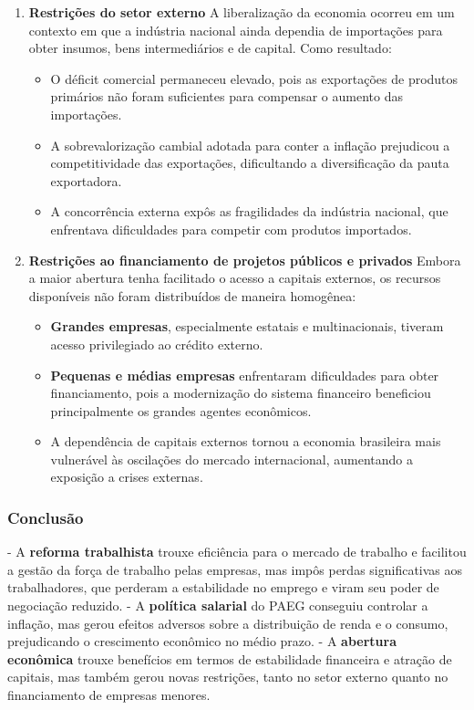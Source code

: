 \documentclass[a4paper,12pt]{article}[abntex2]
\begin{document}
\begin{enumerate}
    \item \textbf{Restrições do setor externo}  
    A liberalização da economia ocorreu em um contexto em que a indústria nacional ainda dependia de importações para obter insumos, bens intermediários e de capital. Como resultado:
    \begin{itemize}
        \item O déficit comercial permaneceu elevado, pois as exportações de produtos primários não foram suficientes para compensar o aumento das importações.
        \item A sobrevalorização cambial adotada para conter a inflação prejudicou a competitividade das exportações, dificultando a diversificação da pauta exportadora.
        \item A concorrência externa expôs as fragilidades da indústria nacional, que enfrentava dificuldades para competir com produtos importados.
    \end{itemize}

    \item \textbf{Restrições ao financiamento de projetos públicos e privados}  
    Embora a maior abertura tenha facilitado o acesso a capitais externos, os recursos disponíveis não foram distribuídos de maneira homogênea:
    \begin{itemize}
        \item \textbf{Grandes empresas}, especialmente estatais e multinacionais, tiveram acesso privilegiado ao crédito externo.
        \item \textbf{Pequenas e médias empresas} enfrentaram dificuldades para obter financiamento, pois a modernização do sistema financeiro beneficiou principalmente os grandes agentes econômicos.
        \item A dependência de capitais externos tornou a economia brasileira mais vulnerável às oscilações do mercado internacional, aumentando a exposição a crises externas.
    \end{itemize}
\end{enumerate}

\subsubsection{Conclusão}
- A \textbf{reforma trabalhista} trouxe eficiência para o mercado de trabalho e facilitou a gestão da força de trabalho pelas empresas, mas impôs perdas significativas aos trabalhadores, que perderam a estabilidade no emprego e viram seu poder de negociação reduzido.
- A \textbf{política salarial} do PAEG conseguiu controlar a inflação, mas gerou efeitos adversos sobre a distribuição de renda e o consumo, prejudicando o crescimento econômico no médio prazo.
- A \textbf{abertura econômica} trouxe benefícios em termos de estabilidade financeira e atração de capitais, mas também gerou novas restrições, tanto no setor externo quanto no financiamento de empresas menores.
\end{document}
